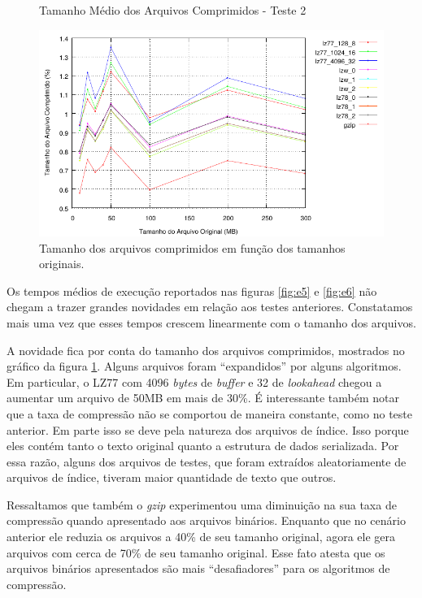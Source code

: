 \documentclass[]{article}
\newcommand{\figref}[1]{figura \ref{#1}}
\begin{document}
\begin{figure}
	{\centering Tamanho Médio dos Arquivos Comprimidos - Teste 2\par}
	\includegraphics{images/binario_taxa}
\caption{Tamanho dos arquivos comprimidos em função dos tamanhos originais.}
\label{fig:e7}
\end{figure}


Os tempos médios de execução reportados nas figuras \ref{fig:e5} e \ref{fig:e6} não chegam a trazer grandes novidades em relação aos testes anteriores. Constatamos mais uma vez que esses tempos crescem linearmente com o tamanho dos arquivos.

A novidade fica por conta do tamanho dos arquivos comprimidos, mostrados no gráfico da \figref{fig:e7}. Alguns arquivos foram ``expandidos'' por alguns algoritmos. Em particular, o LZ77 com 4096 \textit{bytes} de \textit{buffer} e 32 de \textit{lookahead} chegou a aumentar um arquivo de 50MB em mais de 30\%. É interessante também notar que a taxa de compressão não se comportou de maneira constante, como no teste anterior. Em parte isso se deve pela natureza dos arquivos de índice. Isso porque eles contém tanto o texto original quanto a estrutura de dados serializada. Por essa razão, alguns dos arquivos de testes, que foram extraídos aleatoriamente de arquivos de índice, tiveram maior quantidade de texto que outros.

Ressaltamos que também o \textit{gzip} experimentou uma diminuição na sua taxa de compressão quando apresentado aos arquivos binários. Enquanto que no cenário anterior ele reduzia os arquivos a 40\% de seu tamanho original, agora ele gera arquivos com cerca de 70\% de seu tamanho original. Esse fato atesta que os arquivos binários apresentados são mais ``desafiadores'' para os algoritmos de compressão.
\end{document}
